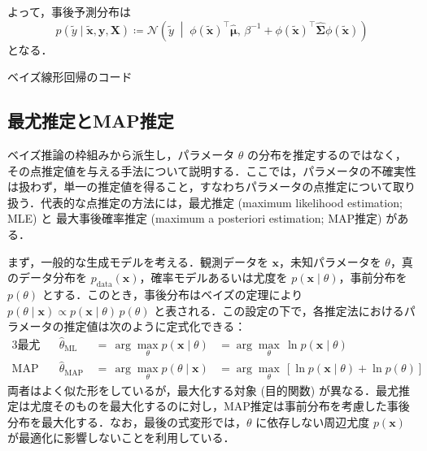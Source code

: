 \documentclass[titlepage]{ltjsbook}
\begin{document}
よって，事後予測分布は
\begin{equation}
p(\tilde{y} \mid \tilde{\mathbf{x}},\mathbf{y},\mathbf{X})\coloneq\mathcal{N}\left(\tilde{y}\;\middle\vert\; \phi(\tilde{\mathbf{x}})^\top\hat{\boldsymbol{\mu}},\,\beta^{-1}+\phi(\tilde{\mathbf{x}})^\top\hat{\boldsymbol{\Sigma}} \phi(\tilde{\mathbf{x}})\right)
\end{equation}
となる．

\begin{tcolorbox}
ベイズ線形回帰のコード
\end{tcolorbox}

\subsection{最尤推定とMAP推定}
ベイズ推論の枠組みから派生し，パラメータ $\theta$ の分布を推定するのではなく，その点推定値を与える手法について説明する．ここでは，パラメータの不確実性は扱わず，単一の推定値を得ること，すなわちパラメータの点推定について取り扱う．代表的な点推定の方法には，最尤推定 (maximum likelihood estimation; MLE) と 最大事後確率推定 (maximum a posteriori estimation; MAP推定) がある．

まず，一般的な生成モデルを考える．観測データを $\mathbf{x}$，未知パラメータを $\theta$，真のデータ分布を $p_{\mathrm{data}}(\mathbf{x})$，確率モデルあるいは尤度を $p(\mathbf{x}\mid \theta)$，事前分布を $p(\theta)$ とする．このとき，事後分布はベイズの定理により $p(\theta \mid \mathbf{x}) \propto p(\mathbf{x}\mid \theta)\,p(\theta)$ と表される．この設定の下で，各推定法におけるパラメータの推定値は次のように定式化できる：
\begin{alignat}{3}
\text{最尤推定:} &\quad \hat{\theta}_{\mathrm{ML}}\,&=\, \arg\max_{\theta} p(\mathbf{x} \mid \theta) &= \arg\max_{\theta}\, \ln p(\mathbf{x} \mid \theta)\\
\text{MAP推定:} &\quad \hat{\theta}_{\mathrm{MAP}}\,&=\, \arg\max_{\theta} p(\theta \mid \mathbf{x}) &= \arg\max_{\theta}\,\left[\ln p(\mathbf{x} \mid \theta) + \ln p(\theta)\right]
\end{alignat}
両者はよく似た形をしているが，最大化する対象 (目的関数) が異なる．最尤推定は尤度そのものを最大化するのに対し，MAP推定は事前分布を考慮した事後分布を最大化する．なお，最後の式変形では，$\theta$ に依存しない周辺尤度 $p(\mathbf{x})$ が最適化に影響しないことを利用している．
\end{document}
